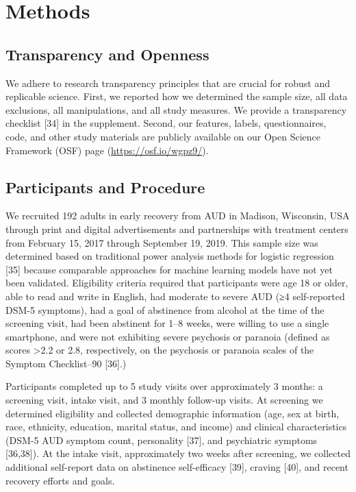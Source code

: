 \documentclass[
  letterpaper,
  DIV=11,
  numbers=noendperiod]{scrartcl}
\begin{document}
\section{Methods}\label{methods}

\subsection{Transparency and Openness}\label{transparency-and-openness}

We adhere to research transparency principles that are crucial for
robust and replicable science. First, we reported how we determined the
sample size, all data exclusions, all manipulations, and all study
measures. We provide a transparency checklist {[}34{]} in the
supplement. Second, our features, labels, questionnaires, code, and
other study materials are publicly available on our Open Science
Framework (OSF) page (\url{https://osf.io/wgpz9/}).

\subsection{Participants and
Procedure}\label{participants-and-procedure}

We recruited 192 adults in early recovery from AUD in Madison,
Wisconsin, USA through print and digital advertisements and partnerships
with treatment centers from February 15, 2017 through September 19,
2019. This sample size was determined based on traditional power
analysis methods for logistic regression {[}35{]} because comparable
approaches for machine learning models have not yet been validated.
Eligibility criteria required that participants were age 18 or older,
able to read and write in English, had moderate to severe AUD (≥4
self-reported DSM-5 symptoms), had a goal of abstinence from alcohol at
the time of the screening visit, had been abstinent for 1--8 weeks, were
willing to use a single smartphone, and were not exhibiting severe
psychosis or paranoia (defined as scores \textgreater2.2 or 2.8,
respectively, on the psychosis or paranoia scales of the Symptom
Checklist--90 {[}36{]}.)

Participants completed up to 5 study visits over approximately 3 months:
a screening visit, intake visit, and 3 monthly follow-up visits. At
screening we determined eligibility and collected demographic
information (age, sex at birth, race, ethnicity, education, marital
status, and income) and clinical characteristics (DSM-5 AUD symptom
count, personality {[}37{]}, and psychiatric symptoms {[}36,38{]}). At
the intake visit, approximately two weeks after screening, we collected
additional self-report data on abstinence self-efficacy {[}39{]},
craving {[}40{]}, and recent recovery efforts and goals.
\end{document}
